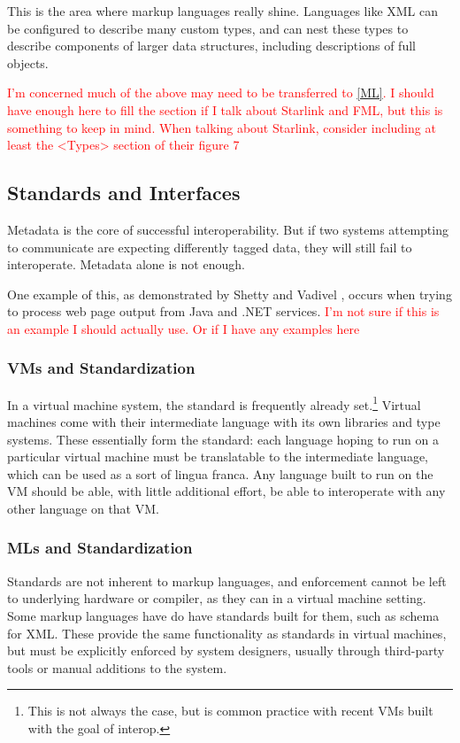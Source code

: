 \documentclass{sig-alternate}
\newcommand{\mycomment}[1]{\textcolor{red}{#1}}
\begin{document}
This is the area where markup languages really shine. Languages like XML can be configured to describe many custom types, and can nest these types to describe components of larger data structures, including descriptions of full objects.

\mycomment{I'm concerned much of the above may need to be transferred to \ref{ML}. I should have enough here to fill the section if I talk about Starlink and FML, but this is something to keep in mind.}
\mycomment{When talking about Starlink, consider including at least the <Types> section of their figure 7}

\subsection{Standards and Interfaces}\label{standards}
Metadata is the core of successful interoperability. But if two systems attempting to communicate are expecting differently tagged data, they will still fail to interoperate. Metadata alone is not enough.

One example of this, as demonstrated by Shetty and Vadivel \cite{Shetty:2009}, occurs when trying to process web page output from Java and .NET services. \mycomment{I'm not sure if this is an example I should actually use. Or if I have any examples here}

\subsubsection*{VMs and Standardization}
In a virtual machine system, the standard is frequently already set.\footnote{This is not always the case, but is common practice with recent VMs built with the goal of interop.} Virtual machines come with their intermediate language with its own libraries and type systems. These essentially form the standard: each language hoping to run on a particular virtual machine must be translatable to the intermediate language, which can be used as a sort of lingua franca. Any language built to run on the VM should be able, with little additional effort, be able to interoperate with any other language on that VM.


\subsubsection*{MLs and Standardization}
Standards are not inherent to markup languages, and enforcement cannot be left to underlying hardware or compiler, as they can in a virtual machine setting. Some markup languages have do have standards built for them, such as schema for XML. These provide the same functionality as standards in virtual machines, but must be explicitly enforced by system designers, usually through third-party tools or manual additions to the system.
\end{document}
